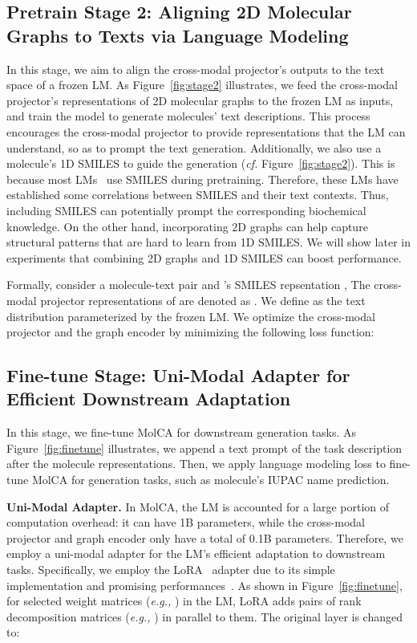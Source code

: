 \documentclass[11pt]{article}
\newcommand{\eg}{\emph{e.g., }}
\newcommand{\cf}{\emph{cf. }}
\begin{document}
\subsection{Pretrain Stage 2: Aligning 2D Molecular Graphs to Texts via Language Modeling}
In this stage, we aim to align the cross-modal projector's outputs to the text space of a frozen LM. As Figure~\ref{fig:stage2} illustrates, we feed the cross-modal projector's representations of 2D molecular graphs to the frozen LM as inputs, and train the model to generate molecules' text descriptions. This process encourages the cross-modal projector to provide representations that the LM can understand, so as to prompt the text generation. 
Additionally, we also use a molecule's 1D SMILES to guide the generation (\cf Figure~\ref{fig:stage2}). This is because most LMs~\citep{Galactica, LLama, OPT} use SMILES during pretraining. Therefore, these LMs have established some correlations between SMILES and their text contexts. Thus, including SMILES can potentially prompt the corresponding biochemical knowledge. On the other hand, incorporating 2D graphs can help capture structural patterns that are hard to learn from 1D SMILES. We will show later in experiments that combining 2D graphs and 1D SMILES can boost performance.

Formally, consider a molecule-text pair  and 's SMILES repsentation , The cross-modal projector representations of  are denoted as . We define  as the text distribution parameterized by the frozen LM. We optimize the cross-modal projector and the graph encoder by minimizing the following loss function:



\subsection{Fine-tune Stage: Uni-Modal Adapter for Efficient Downstream Adaptation}
\label{sec:fine-tune}
In this stage, we fine-tune MolCA for downstream generation tasks. As Figure~\ref{fig:finetune} illustrates, we append a text prompt of the task description after the molecule representations. Then, we apply language modeling loss to fine-tune MolCA for generation tasks, such as molecule's IUPAC name prediction. 

\textbf{Uni-Modal Adapter.} In MolCA, the LM is accounted for a large portion of computation overhead: it can have 1B parameters, while the cross-modal projector and graph encoder only have a total of 0.1B parameters. 
Therefore, we employ a uni-modal adapter for the LM's efficient adaptation to downstream tasks. Specifically, we employ the LoRA~\citep{LoRA} adapter due to its simple implementation and promising performances~\citep{DBLP:conf/nips/LiuTMMHBR22}. As shown in Figure~\ref{fig:finetune}, for selected weight matrices (\eg ) in the LM, LoRA adds pairs of rank decomposition matrices (\eg ) in parallel to them. The original  layer is changed to:
\end{document}
